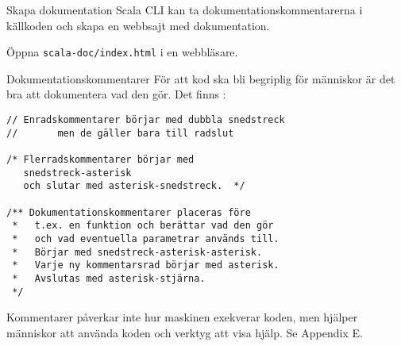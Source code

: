 \begin{Slide}{Skapa dokumentation}
Scala CLI kan ta dokumentationskommentarerna i källkoden och skapa en webbsajt med dokumentation.

\vspace{2em}

\vspace{1em} Öppna \texttt{scala-doc/index.html} i en webbläsare.
\end{Slide}
  
  

\begin{Slide}{Dokumentationskommentarer}\footnotesize
För att kod ska bli begriplig för människor är det bra att dokumentera vad den gör. Det finns :
\begin{lstlisting}
// Enradskommentarer börjar med dubbla snedstreck
//       men de gäller bara till radslut

/* Flerradskommentarer börjar med
   snedstreck-asterisk
   och slutar med asterisk-snedstreck.  */

/** Dokumentationskommentarer placeras före
 *   t.ex. en funktion och berättar vad den gör
 *   och vad eventuella parametrar används till.
 *   Börjar med snedstreck-asterisk-asterisk.
 *   Varje ny kommentarsrad börjar med asterisk.
 *   Avslutas med asterisk-stjärna.
 */
\end{lstlisting}
Kommentarer påverkar inte hur maskinen exekverar koden, men hjälper människor att använda koden och verktyg att visa hjälp. Se Appendix E.
\end{Slide}

